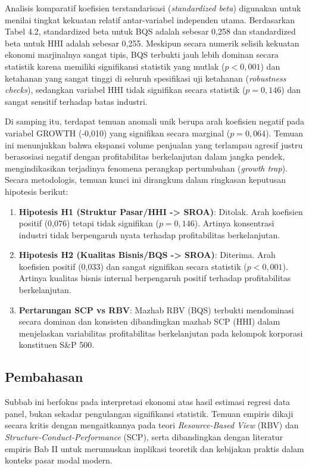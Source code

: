 \documentclass[12pt,a4paper]{article}
\providecommand{\tightlist}{%
  \setlength{\itemsep}{0pt}\setlength{\parskip}{0pt}%
}
\begin{document}
Analisis komparatif koefisien terstandarisasi (\emph{standardized beta})
digunakan untuk menilai tingkat kekuatan relatif antar-variabel
independen utama. Berdasarkan Tabel 4.2, standardized beta untuk BQS
adalah sebesar 0,258 dan standardized beta untuk HHI adalah sebesar
0,255. Meskipun secara numerik selisih kekuatan ekonomi marjinalnya
sangat tipis, BQS terbukti jauh lebih dominan secara statistik karena
memiliki signifikansi statistik yang mutlak (\(p < 0,001\)) dan
ketahanan yang sangat tinggi di seluruh spesifikasi uji ketahanan
(\emph{robustness checks}), sedangkan variabel HHI tidak signifikan
secara statistik (\(p = 0,146\)) dan sangat sensitif terhadap batas
industri.

Di samping itu, terdapat temuan anomali unik berupa arah koefisien
negatif pada variabel GROWTH (-0,010) yang signifikan secara marginal
(\(p = 0,064\)). Temuan ini menunjukkan bahwa ekspansi volume penjualan
yang terlampau agresif justru berasosiasi negatif dengan profitabilitas
berkelanjutan dalam jangka pendek, mengindikasikan terjadinya fenomena
perangkap pertumbuhan (\emph{growth trap}). Secara metodologis, temuan
kunci ini dirangkum dalam ringkasan keputusan hipotesis berikut:

\begin{enumerate}
\def\labelenumi{\arabic{enumi}.}
\tightlist
\item
  \textbf{Hipotesis H1 (Struktur Pasar/HHI -\textgreater{} SROA)}:
  Ditolak. Arah koefisien positif (0,076) tetapi tidak signifikan
  (\(p = 0,146\)). Artinya konsentrasi industri tidak berpengaruh nyata
  terhadap profitabilitas berkelanjutan.
\item
  \textbf{Hipotesis H2 (Kualitas Bisnis/BQS -\textgreater{} SROA)}:
  Diterima. Arah koefisien positif (0,033) dan sangat signifikan secara
  statistik (\(p < 0,001\)). Artinya kualitas bisnis internal
  berpengaruh positif terhadap profitabilitas berkelanjutan.
\item
  \textbf{Pertarungan SCP vs RBV}: Mazhab RBV (BQS) terbukti mendominasi
  secara dominan dan konsisten dibandingkan mazhab SCP (HHI) dalam
  menjelaskan variabilitas profitabilitas berkelanjutan pada kelompok
  korporasi konstituen S\&P 500.
\end{enumerate}

\subsection{Pembahasan}\label{pembahasan}

Subbab ini berfokus pada interpretasi ekonomi atas hasil estimasi
regresi data panel, bukan sekadar pengulangan signifikansi statistik.
Temuan empiris dikaji secara kritis dengan mengaitkannya pada teori
\emph{Resource-Based View} (RBV) dan
\emph{Structure-Conduct-Performance} (SCP), serta dibandingkan dengan
literatur empiris Bab II untuk merumuskan implikasi teoretik dan
kebijakan praktis dalam konteks pasar modal modern.
\end{document}
